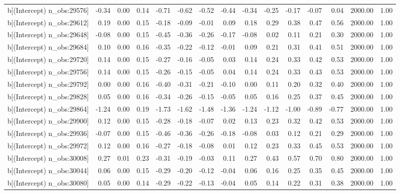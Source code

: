 \begin{table}[ht]
\begin{tabular}{rrrrrrrrrrrrrrr}
  b[(Intercept) n\_obs:29576] & -0.34 & 0.00 & 0.14 & -0.71 & -0.62 & -0.52 & -0.44 & -0.34 & -0.25 & -0.17 & -0.07 & 0.04 & 2000.00 & 1.00 \\ 
  b[(Intercept) n\_obs:29612] & 0.19 & 0.00 & 0.15 & -0.18 & -0.09 & -0.01 & 0.09 & 0.18 & 0.29 & 0.38 & 0.47 & 0.56 & 2000.00 & 1.00 \\ 
  b[(Intercept) n\_obs:29648] & -0.08 & 0.00 & 0.15 & -0.45 & -0.36 & -0.26 & -0.17 & -0.08 & 0.02 & 0.11 & 0.21 & 0.30 & 2000.00 & 1.00 \\ 
  b[(Intercept) n\_obs:29684] & 0.10 & 0.00 & 0.16 & -0.35 & -0.22 & -0.12 & -0.01 & 0.09 & 0.21 & 0.31 & 0.41 & 0.51 & 2000.00 & 1.00 \\ 
  b[(Intercept) n\_obs:29720] & 0.14 & 0.00 & 0.15 & -0.27 & -0.16 & -0.05 & 0.03 & 0.14 & 0.24 & 0.33 & 0.42 & 0.53 & 2000.00 & 1.00 \\ 
  b[(Intercept) n\_obs:29756] & 0.14 & 0.00 & 0.15 & -0.26 & -0.15 & -0.05 & 0.04 & 0.14 & 0.24 & 0.33 & 0.43 & 0.53 & 2000.00 & 1.00 \\ 
  b[(Intercept) n\_obs:29792] & 0.00 & 0.00 & 0.16 & -0.40 & -0.31 & -0.21 & -0.10 & 0.00 & 0.11 & 0.20 & 0.32 & 0.40 & 2000.00 & 1.00 \\ 
  b[(Intercept) n\_obs:29828] & 0.05 & 0.00 & 0.16 & -0.34 & -0.26 & -0.15 & -0.05 & 0.05 & 0.16 & 0.25 & 0.37 & 0.45 & 2000.00 & 1.00 \\ 
  b[(Intercept) n\_obs:29864] & -1.24 & 0.00 & 0.19 & -1.73 & -1.62 & -1.48 & -1.36 & -1.24 & -1.12 & -1.00 & -0.89 & -0.77 & 2000.00 & 1.00 \\ 
  b[(Intercept) n\_obs:29900] & 0.12 & 0.00 & 0.15 & -0.28 & -0.18 & -0.07 & 0.02 & 0.13 & 0.23 & 0.32 & 0.42 & 0.53 & 2000.00 & 1.00 \\ 
  b[(Intercept) n\_obs:29936] & -0.07 & 0.00 & 0.15 & -0.46 & -0.36 & -0.26 & -0.18 & -0.08 & 0.03 & 0.12 & 0.21 & 0.29 & 2000.00 & 1.00 \\ 
  b[(Intercept) n\_obs:29972] & 0.12 & 0.00 & 0.16 & -0.27 & -0.18 & -0.08 & 0.01 & 0.12 & 0.23 & 0.33 & 0.45 & 0.53 & 2000.00 & 1.00 \\ 
  b[(Intercept) n\_obs:30008] & 0.27 & 0.01 & 0.23 & -0.31 & -0.19 & -0.03 & 0.11 & 0.27 & 0.43 & 0.57 & 0.70 & 0.80 & 2000.00 & 1.00 \\ 
  b[(Intercept) n\_obs:30044] & 0.06 & 0.00 & 0.15 & -0.29 & -0.20 & -0.12 & -0.04 & 0.06 & 0.16 & 0.25 & 0.35 & 0.45 & 2000.00 & 1.00 \\ 
  b[(Intercept) n\_obs:30080] & 0.05 & 0.00 & 0.14 & -0.29 & -0.22 & -0.13 & -0.04 & 0.05 & 0.14 & 0.22 & 0.31 & 0.38 & 2000.00 & 1.00 \\ 

\end{tabular}
\end{table}
